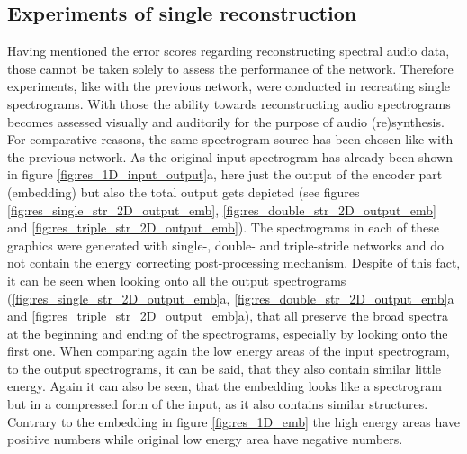\subsection{Experiments of single reconstruction}
Having mentioned the error scores regarding reconstructing spectral audio data, those cannot be taken solely to assess the performance of the network. Therefore experiments, like with the previous network, were conducted in recreating single spectrograms. With those the ability towards reconstructing audio spectrograms becomes assessed visually and auditorily for the purpose of audio (re)synthesis.
For comparative reasons, the same spectrogram source has been chosen like with the previous network. As the original input spectrogram has already been shown in figure \ref{fig:res_1D_input_output}a, here just the output of the encoder part (embedding) but also the total output gets depicted (see figures \ref{fig:res_single_str_2D_output_emb}, \ref{fig:res_double_str_2D_output_emb} and \ref{fig:res_triple_str_2D_output_emb}). The spectrograms in each of these graphics were generated with single-, double- and triple-stride networks and do not contain the energy correcting post-processing mechanism. Despite of this fact, it can be seen when looking onto all the output spectrograms (\ref{fig:res_single_str_2D_output_emb}a, \ref{fig:res_double_str_2D_output_emb}a and \ref{fig:res_triple_str_2D_output_emb}a), that all preserve the broad spectra at the beginning and ending of the spectrograms, especially by looking onto the first one. When comparing again the low energy areas of the input spectrogram, to the output spectrograms, it can be said, that they also contain similar little energy. Again it can also be seen, that the embedding looks like a spectrogram but in a compressed form of the input, as it also contains similar structures. Contrary to the embedding in figure \ref{fig:res_1D_emb} the high energy areas have positive numbers while original low energy area have negative numbers.

